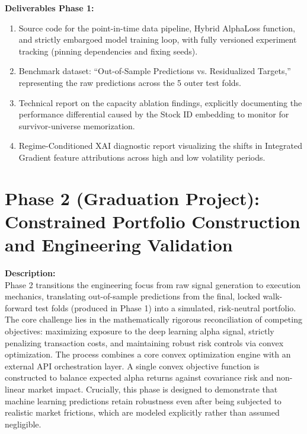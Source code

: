 \documentclass[twoside,final]{hcmut-report}
\begin{document}
\vspace{0.5em}
\textbf{Deliverables Phase 1:}
\begin{enumerate}
  \item Source code for the point-in-time data pipeline, Hybrid AlphaLoss function, and strictly embargoed model training loop, with fully versioned experiment tracking (pinning dependencies and fixing seeds).
  \item Benchmark dataset: ``Out-of-Sample Predictions vs. Residualized Targets,'' representing the raw predictions across the 5 outer test folds.
  \item Technical report on the capacity ablation findings, explicitly documenting the performance differential caused by the Stock ID embedding to monitor for survivor-universe memorization.
  \item Regime-Conditioned XAI diagnostic report visualizing the shifts in Integrated Gradient feature attributions across high and low volatility periods.
\end{enumerate}


\section{Phase 2 (Graduation Project): Constrained Portfolio Construction and Engineering Validation}

\textbf{Description:} \\
Phase 2 transitions the engineering focus from raw signal generation to execution mechanics, translating out-of-sample predictions from the final, locked walk-forward test folds (produced in Phase 1) into a simulated, risk-neutral portfolio. The core challenge lies in the mathematically rigorous reconciliation of competing objectives: maximizing exposure to the deep learning alpha signal, strictly penalizing transaction costs, and maintaining robust risk controls via convex optimization. The process combines a core convex optimization engine with an external API orchestration layer. A single convex objective function is constructed to balance expected alpha returns against covariance risk and non-linear market impact. Crucially, this phase is designed to demonstrate that machine learning predictions retain robustness even after being subjected to realistic market frictions, which are modeled explicitly rather than assumed negligible.
\end{document}
